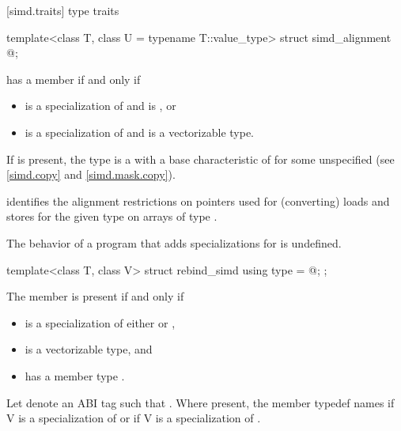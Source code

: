 [simd.traits]{ type traits}

\begin{itemdecl}
template<class T, class U = typename T::value_type> struct simd_alignment { @\seebelow@ };
\end{itemdecl}

\begin{itemdescr}
\pnum
{} has a member  if and only if
\begin{itemize}
  \item {} is a specialization of  and  is , or
  \item {} is a specialization of  and  is a vectorizable type.
\end{itemize}

\pnum
If  is present, the type  is a  with
a base characteristic of  for some unspecified
 (see \ref{simd.copy} and \ref{simd.mask.copy}). \begin{note} identifies the
alignment restrictions on pointers used for (converting) loads and stores for the given type
 on arrays of type .\end{note}

\pnum
The behavior of a program that adds specializations for  is undefined.
\end{itemdescr}

\begin{itemdecl}
template<class T, class V> struct rebind_simd { using type = @\seebelow@; };
\end{itemdecl}

\begin{itemdescr}
  \pnum
  The member  is present if and only if
  \begin{itemize}
    \item {} is a specialization of either  or
      ,
    \item {} is a vectorizable type, and
    \item {} has a member type .
  \end{itemize}

  \pnum
  Let  denote an ABI tag such that .
  Where present, the member typedef  names  if \tcode V is a specialization of  or
   if \tcode V is a specialization of
  .
\end{itemdescr}

